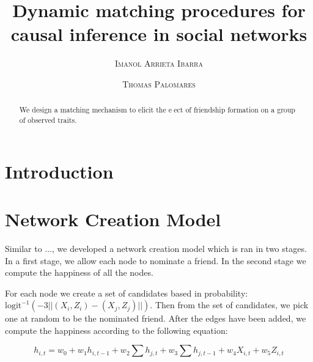 \documentclass[11pt]{article}
\title{Dynamic matching procedures for causal inference in social networks}
\author{{\textsc{Imanol Arrieta Ibarra}} \\
 \and {\textsc{Thomas Palomares}} \\
}
\begin{document}
\maketitle


\begin{abstract}
We design a matching mechanism to elicit the eect of friendship formation on a group of observed traits.
\end{abstract}

\newpage

\section{Introduction}



\section{Network Creation Model}

Similar to ..., we developed a network creation model which is ran in two stages. In a first stage, we allow each node to nominate a friend. In the second stage we compute the happiness of all the nodes.

For each node we create a set of candidates based in probability: $\text{logit}^{-1} \left(-3||(X_i,Z_i)-(X_j,Z_j)||\right)$. Then from the set of candidates, we pick one at random to be the nominated friend. After the edges have been added, we compute the happiness according to the following equation:

$$h_{i,t} = w_0 +w_1 h_{i,t-1} + w_2\sum\limits h_{j,t} + w_3\sum\limits h_{j,t-1} + w_4 X_{i,t} + w_5 Z_{i,t}$$




\end{document}
